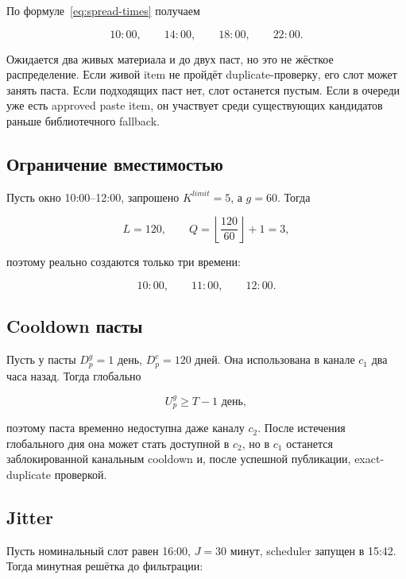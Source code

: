 \documentclass[12pt,a4paper]{article}
\begin{document}
По формуле~\eqref{eq:spread-times} получаем

\begin{equation}
  10{:}00,\qquad14{:}00,\qquad18{:}00,\qquad22{:}00.
\end{equation}

Ожидается два живых материала и до двух паст, но это не жёсткое распределение.
Если живой item не пройдёт duplicate-проверку, его слот может занять паста. Если
подходящих паст нет, слот останется пустым. Если в очереди уже есть approved paste
item, он участвует среди существующих кандидатов раньше библиотечного fallback.

\subsection{Ограничение вместимостью}

Пусть окно 10:00--12:00, запрошено $K^{limit}=5$, а $g=60$. Тогда

\begin{equation}
  L=120,\qquad Q=\left\lfloor\frac{120}{60}\right\rfloor+1=3,
\end{equation}

поэтому реально создаются только три времени:

\begin{equation}
  10{:}00,\qquad11{:}00,\qquad12{:}00.
\end{equation}

\subsection{Cooldown пасты}

Пусть у пасты $D_p^g=1$ день, $D_p^c=120$ дней. Она использована в канале $c_1$
два часа назад. Тогда глобально

\begin{equation}
  U_p^g\geq T-1\text{ день},
\end{equation}

поэтому паста временно недоступна даже каналу $c_2$. После истечения глобального
дня она может стать доступной в $c_2$, но в $c_1$ останется заблокированной
канальным cooldown и, после успешной публикации, exact-duplicate проверкой.

\subsection{Jitter}

Пусть номинальный слот равен 16:00, $J=30$ минут, scheduler запущен в 15:42.
Тогда минутная решётка до фильтрации:
\end{document}
